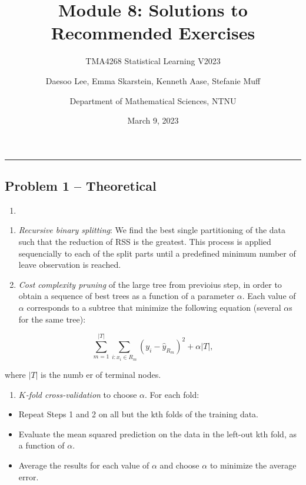\documentclass[
]{article}
\title{Module 8: Solutions to Recommended Exercises}
\subtitle{TMA4268 Statistical Learning V2023}
\author{Daesoo Lee, Emma Skarstein, Kenneth Aase, Stefanie
Muff \and Department of Mathematical Sciences, NTNU}
\date{March 9, 2023}
\providecommand{\tightlist}{%
  \setlength{\itemsep}{0pt}\setlength{\parskip}{0pt}}
\begin{document}
\maketitle

\begin{center}\rule{0.5\linewidth}{0.5pt}\end{center}

\hypertarget{problem-1-theoretical}{%
\subsection{Problem 1 -- Theoretical}\label{problem-1-theoretical}}

\begin{enumerate}
\def\labelenumi{\alph{enumi})}
\tightlist
\item
\end{enumerate}

\begin{enumerate}
\def\labelenumi{\arabic{enumi}.}
\item
  \emph{Recursive binary splitting}: We find the best single
  partitioning of the data such that the reduction of RSS is the
  greatest. This process is applied sequencially to each of the split
  parts until a predefined minimum number of leave observation is
  reached.
\item
  \emph{Cost complexity pruning} of the large tree from previoius step,
  in order to obtain a sequence of best trees as a function of a
  parameter \(\alpha\). Each value of \(\alpha\) corresponds to a
  subtree that minimize the following equation (several \(\alpha\)s for
  the same tree):
\end{enumerate}

\[\sum_{m=1}^{|T|}\sum_{i:x_i\in R_m}(y_i - \hat y_{R_m})^2 + \alpha |T|,\]

where \(|T|\) is the numb er of terminal nodes.

\begin{enumerate}
\def\labelenumi{\arabic{enumi}.}
\setcounter{enumi}{2}
\tightlist
\item
  \emph{\(K\)-fold cross-validation} to choose \(\alpha\). For each
  fold:
\end{enumerate}

\begin{itemize}
\tightlist
\item
  Repeat Steps 1 and 2 on all but the kth folds of the training data.
\item
  Evaluate the mean squared prediction on the data in the left-out kth
  fold, as a function of \(\alpha\).
\item
  Average the results for each value of \(\alpha\) and choose \(\alpha\)
  to minimize the average error.
\end{itemize}
\end{document}
